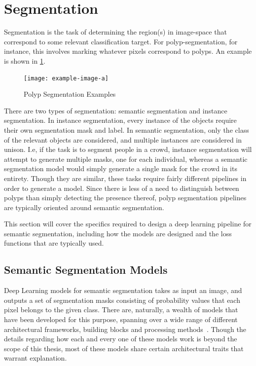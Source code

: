 \section{Segmentation}
    Segmentation is the task of determining the region(s) in image-space that correspond to some relevant classification target. For polyp-segmentation, for instance, this involves marking whatever pixels correspond to polyps. An example is shown in \ref{fig:segmentation}. 
    \begin{figure}[ht]
        \centering
        \texttt{[image: example-image-a]}
        \caption{Polyp Segmentation Examples}
        \label{fig:segmentation}
    \end{figure}
    
    There are two types of segmentation: semantic segmentation and instance segmentation. In instance segmentation, every instance of the objects require their own segmentation mask and label. In semantic segmentation, only the class of the relevant objects are considered, and multiple instances are considered in unison.  I.e, if the task is to segment people in a crowd, instance segmentation will attempt to generate multiple masks, one for each individual, whereas a semantic segmentation model would simply generate a single mask for the crowd in its entirety. Though they are similar, these tasks require fairly different pipelines in order to generate a model. Since there is less of a need to distinguish between polyps than simply detecting the presence thereof, polyp segmentation pipelines are typically oriented around semantic segmentation. 
    
    This section will cover the specifics required to design a deep learning pipeline for semantic segmentation, including how the models are designed and the loss functions that are typically used. 
    
    \subsection{Semantic Segmentation Models}
    Deep Learning models for semantic segmentation takes as input an image, and outputs a set of segmentation masks consisting of probability values that each pixel belongs to the given class. There are, naturally, a wealth of models that have been developed for this purpose, spanning over a wide range of different architectural frameworks, building blocks and processing methods~\cite{semantic_segmentation_survey}. Though the details regarding how each and every one of these models work is beyond the scope of this thesis, most of these models share certain architectural traits that warrant explanation. 
    
